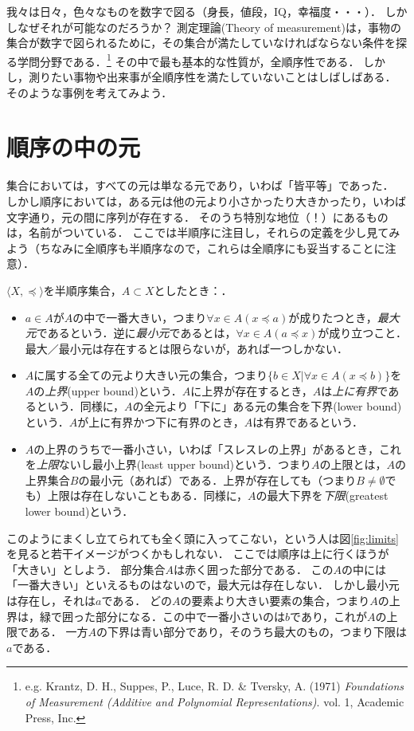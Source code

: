 \documentclass[dvipdfmx,11pt,a4paper]{jsarticle}
\begin{document}
\begin{example}[測定理論]
我々は日々，色々なものを数字で図る（身長，値段，IQ，幸福度・・・）．
しかしなぜそれが可能なのだろうか？
測定理論(Theory of measurement)は，事物の集合が数字で図られるために，その集合が満たしていなければならない条件を探る学問分野である．\footnote{e.g. Krantz, D. H., Suppes, P., Luce, R. D. \& Tversky, A. (1971) \textit{Foundations of Measurement (Additive and Polynomial Representations)}. vol. 1, Academic Press, Inc.}
その中で最も基本的な性質が，全順序性である．
しかし，測りたい事物や出来事が全順序性を満たしていないことはしばしばある．
そのような事例を考えてみよう．
\end{example}


\section{順序の中の元}
集合においては，すべての元は単なる元であり，いわば「皆平等」であった．
しかし順序においては，ある元は他の元より小さかったり大きかったり，いわば文字通り，元の間に序列が存在する．
そのうち特別な地位（！）にあるものは，名前がついている．
ここでは半順序に注目し，それらの定義を少し見てみよう（ちなみに全順序も半順序なので，これらは全順序にも妥当することに注意）．

$\langle X, \preceq \rangle$を半順序集合，$A \subset X$としたとき：．
\begin{itemize}
  \item $a \in A$が$A$の中で一番大きい，つまり$\forall x \in A (x \preceq a)$が成りたつとき，\emph{最大元}であるという．逆に\emph{最小元}であるとは，$\forall x \in A (a \preceq x)$が成り立つこと．最大／最小元は存在するとは限らないが，あれば一つしかない．
  \item $A$に属する全ての元より大きい元の集合，つまり$\{ b \in X | \forall x \in A (x \preceq b) \}$を$A$の\emph{上界}(upper bound)という．$A$に上界が存在するとき，$A$は\emph{上に有界}であるという．同様に，$A$の全元より「下に」ある元の集合を下界(lower bound)という．$A$が上に有界かつ下に有界のとき，$A$は有界であるという．
  \item $A$の上界のうちで一番小さい，いわば「スレスレの上界」があるとき，これを\emph{上限}ないし最小上界(least upper bound)という．つまり$A$の上限とは，$A$の上界集合$B$の最小元（あれば）である．上界が存在しても（つまり$B \neq \emptyset$でも）上限は存在しないこともある．同様に，$A$の最大下界を\emph{下限}(greatest lower bound)という．
\end{itemize}


  このようにまくし立てられても全く頭に入ってこない，という人は図\ref{fig:limits}を見ると若干イメージがつくかもしれない．
ここでは順序は上に行くほうが「大きい」としよう．
部分集合$A$は赤く囲った部分である．
この$A$の中には「一番大きい」といえるものはないので，最大元は存在しない．
しかし最小元は存在し，それは$a$である．
どの$A$の要素より大きい要素の集合，つまり$A$の上界は，緑で囲った部分になる．この中で一番小さいのは$b$であり，これが$A$の上限である．
一方$A$の下界は青い部分であり，そのうち最大のもの，つまり下限は$a$である．
\end{document}
